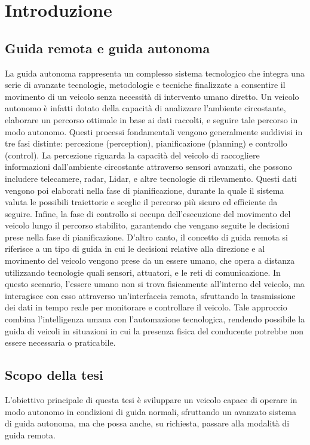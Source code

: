 \section{Introduzione}
\subsection{Guida remota e guida autonoma}
La guida autonoma rappresenta un complesso sistema tecnologico che integra una serie di avanzate tecnologie, metodologie e tecniche finalizzate a consentire il movimento di un veicolo senza necessità di intervento umano diretto. Un veicolo autonomo è infatti dotato della capacità di analizzare l'ambiente circostante, elaborare un percorso ottimale in base ai dati raccolti, e seguire tale percorso in modo autonomo. Questi processi fondamentali vengono generalmente suddivisi in tre fasi distinte: percezione (perception), pianificazione (planning) e controllo (control).
La percezione riguarda la capacità del veicolo di raccogliere informazioni dall'ambiente circostante attraverso sensori avanzati, che possono includere telecamere, radar, Lidar, e altre tecnologie di rilevamento. Questi dati vengono poi elaborati nella fase di pianificazione, durante la quale il sistema valuta le possibili traiettorie e sceglie il percorso più sicuro ed efficiente da seguire. Infine, la fase di controllo si occupa dell'esecuzione del movimento del veicolo lungo il percorso stabilito, garantendo che vengano seguite le decisioni prese nella fase di pianificazione.
D'altro canto, il concetto di guida remota si riferisce a un tipo di guida in cui le decisioni relative alla direzione e al movimento del veicolo vengono prese da un essere umano, che opera a distanza utilizzando tecnologie quali sensori, attuatori, e le reti di comunicazione. In questo scenario, l'essere umano non si trova fisicamente all'interno del veicolo, ma interagisce con esso attraverso un'interfaccia remota, sfruttando la trasmissione dei dati in tempo reale per monitorare e controllare il veicolo. Tale approccio combina l'intelligenza umana con l'automazione tecnologica, rendendo possibile la guida di veicoli in situazioni in cui la presenza fisica del conducente potrebbe non essere necessaria o praticabile.
\subsection{Scopo della tesi}
L'obiettivo principale di questa tesi è sviluppare un veicolo capace di operare in modo autonomo in condizioni di guida normali, sfruttando un avanzato sistema di guida autonoma, ma che possa anche, su richiesta, passare alla modalità di guida remota.

